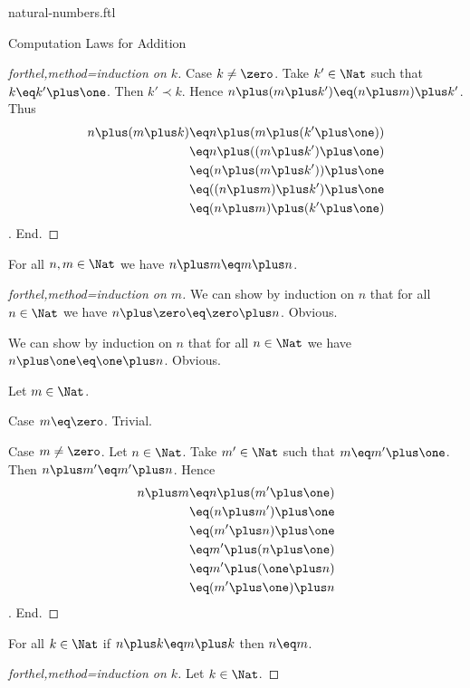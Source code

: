 \documentclass{naproche-library}
\begin{document}
\begin{smodule}[title=Natural Numbers]{natural-numbers.ftl}
\begin{sfragment}{Computation Laws for Addition}
\begin{proof}[forthel,method=induction on $k$]
    Case $k\neq\zero$.
      Take $k'\in\Nat$ such that $k\eq k'\plus\one$.
      Then $k'\prec k$.
      Hence $n\plus(m\plus k')\eq(n\plus m)\plus k'$.
      Thus
      \begin{align*}
        n\plus(m\plus k)
          &\eq n\plus(m\plus(k'\plus\one))\\
          &\eq n\plus((m\plus k')\plus\one)\\
          &\eq (n\plus(m\plus k'))\plus\one\\
          &\eq ((n\plus m)\plus k')\plus\one\\
          &\eq (n\plus m)\plus(k'\plus\one)
      \end{align*}.
    End.
  \end{proof}

  \begin{proposition}[forthel,title=Commutativity,id=PlusIsCommutativeProp]
    For all $n,m\in\Nat$ we have $n\plus m\eq m\plus n$.
  \end{proposition}
  \begin{proof}[forthel,method=induction on $m$]
    We can show by induction on $n$ that for all $n\in\Nat$ we have $n\plus\zero\eq\zero\plus n$.
    Obvious.

    We can show by induction on $n$ that for all $n\in\Nat$ we have $n\plus\one\eq\one\plus n$.
    Obvious.

    Let $m\in\Nat$.

    Case $m\eq\zero$. Trivial.

    Case $m\neq\zero$.
      Let $n\in\Nat$.
      Take $m'\in\Nat$ such that $m\eq m'\plus\one$.
      Then $n\plus m'\eq m'\plus n$.
      Hence
      \begin{align*}
        n\plus m
          &\eq n\plus(m'\plus\one)\\
          &\eq (n\plus m')\plus\one\\
          &\eq (m'\plus n)\plus\one\\
          &\eq m'\plus(n\plus\one)\\
          &\eq m'\plus(\one\plus n)\\
          &\eq (m'\plus\one)\plus n
      \end{align*}.
    End.
  \end{proof}

  \begin{proposition}[forthel,title=Right cancellation,id=PlusIsRightCancellativeProp]
    For all $k\in\Nat$ if $n\plus k\eq m\plus k$ then $n\eq m$.
  \end{proposition}
  \begin{proof}[forthel,method=induction on $k$]
    Let $k\in\Nat$.


\end{proof}
\end{sfragment}
\end{smodule}
\end{document}
